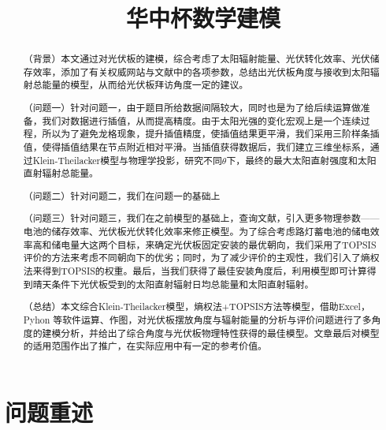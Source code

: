 \documentclass[withoutpreface,bwprint]{cumcmthesis} %
\title{华中杯数学建模}
\begin{document}
 \maketitle



 \begin{abstract}

（背景）本文通过对光伏板的建模，综合考虑了太阳辐射能量、光伏转化效率、光伏储存效率，添加了有关权威网站与文献中的各项参数，总结出光伏板角度与接收到太阳辐射总能量的模型，从而给光伏板拜访角度一定的建议。

（问题一）针对问题一，由于题目所给数据间隔较大，同时也是为了给后续运算做准备，我们对数据进行插值，从而提高精度。由于太阳光强的变化宏观上是一个连续过程，所以为了避免龙格现象，提升插值精度，使插值结果更平滑，我们采用三阶样条插值，使得插值结果在节点附近相对平滑。当插值获得数据后，我们建立三维坐标系，通过Klein-Theilacker模型与物理学投影，研究不同$\theta$下，最终的最大太阳直射强度和太阳直射辐射总能量。

（问题二）针对问题二，我们在问题一的基础上

（问题三）针对问题三，我们在之前模型的基础上，查询文献，引入更多物理参数——电池的储存效率、光伏板光伏转化效率来修正模型。为了综合考虑路灯蓄电池的储电效率高和储电量大这两个目标，来确定光伏板固定安装的最优朝向，我们采用了TOPSIS评价的方法来考虑不同朝向下的优劣；同时，为了减少评价的主观性，我们引入了熵权法来得到TOPSIS的权重。最后，当我们获得了最佳安装角度后，利用模型即可计算得到晴天条件下光伏板受到的太阳直射辐射日均总能量和太阳直射辐射。

（总结）本文综合Klein-Theilacker模型，熵权法+TOPSIS方法等模型，借助Excel，Pyhon 等软件运算、作图，对光伏板摆放角度与辐射能量的分析与评价问题进行了多角度的建模分析，并给出了综合角度与光伏板物理特性获得的最佳模型。文章最后对模型的适用范围作出了推广，在实际应用中有一定的参考价值。


\end{abstract}












\tableofcontents

\newpage






\section{问题重述}
\end{document}
